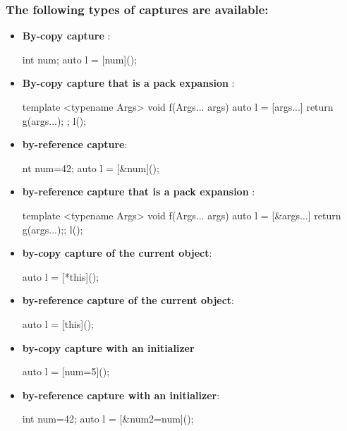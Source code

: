 \documentclass{report}
\begin{document}
\subsubsection{The following types of captures are available:}
\bigbreak \noindent 
\begin{itemize}
    \item \textbf{By-copy capture }:
        \bigbreak \noindent 
        \begin{cppcode}
        int num;
        auto l = [num](){};
        \end{cppcode}
    \item \textbf{By-copy capture that is a pack expansion }:
        \bigbreak \noindent 
        \begin{cppcode}
            template <typename Args>
            void f(Args... args) {
                auto l = [args...] {
                    return g(args...);
                };
                l();
            }
        \end{cppcode}
    \item \textbf{by-reference capture}:
        \bigbreak \noindent 
        \begin{cppcode}
            nt num=42;
            auto l = [&num](){};
        \end{cppcode}
    \item \textbf{by-reference capture that is a pack expansion }:
        \bigbreak \noindent 
        \begin{cppcode}
            template <typename Args>
            void f(Args... args) {
                auto l = [&args...] { return g(args...);};
                l();
            }
        \end{cppcode}
    \item \textbf{by-copy capture of the current object}:
        \bigbreak \noindent 
        \begin{cppcode}
            auto l = [*this](){};
        \end{cppcode}
    \item \textbf{by-reference capture of the current object}:
        \bigbreak \noindent 
        \begin{cppcode}
        auto l = [this](){};
        \end{cppcode}
    \item \textbf{by-copy capture with an initializer}
        \bigbreak \noindent 
        \begin{cppcode}
        auto l = [num=5](){};
        \end{cppcode}
    \item \textbf{by-reference capture with an initializer}:
        \bigbreak \noindent 
        \begin{cppcode}
            int num=42;
            auto l = [&num2=num](){};
        \end{cppcode}
\end{itemize}
\end{document}
